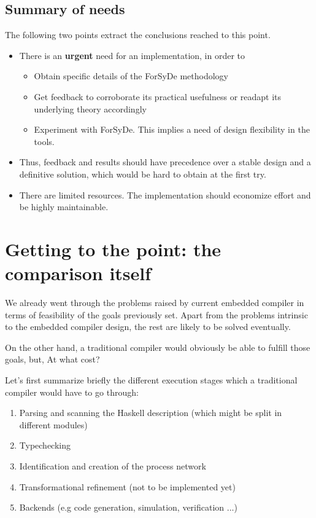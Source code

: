 \documentclass[a4paper,twoside,11pt]{article}
\begin{document}
\subsection{Summary of needs}

The following two points extract the conclusions reached to this point. 

\begin{itemize}
\item There is an \textbf{urgent} need for an implementation, in order to
  \begin{itemize}
    \item Obtain specific details of the ForSyDe methodology 
    \item Get feedback to corroborate its practical usefulness or readapt its
      underlying theory accordingly
    \item Experiment with ForSyDe. This implies a need of design flexibility
      in the tools.
    \end{itemize}
  \item Thus, feedback and results should have precedence over a stable design
    and a definitive solution, which would be hard to obtain at the first try.
  \item There are limited resources. The implementation should economize
    effort and be highly maintainable.
\end{itemize}

\section{Getting to the point: the comparison itself}

We already went through the problems raised by current embedded compiler in
terms of feasibility of the goals previously set. Apart from the problems
intrinsic to the embedded compiler design, the rest are likely to be solved
eventually.

On the other hand, a traditional compiler would obviously be able to fulfill
those goals, but, At what cost?

Let's first summarize briefly the different execution stages which a
traditional compiler would have to go through:

\begin{enumerate}[1)]
\item Parsing and scanning the Haskell description (which might 
  be split in different modules)
\item Typechecking
\item Identification and creation of the process network
\item Transformational refinement (not to be implemented yet)
\item Backends (e.g code generation, simulation, verification ...)
\end{enumerate}
\end{document}
